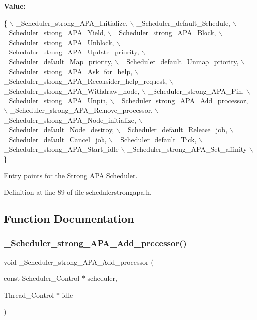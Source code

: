 {\bfseries Value\+:}
\begin{DoxyCode}
\{ \(\backslash\)
    \_Scheduler\_strong\_APA\_Initialize, \(\backslash\)
    \_Scheduler\_default\_Schedule, \(\backslash\)
    \_Scheduler\_strong\_APA\_Yield, \(\backslash\)
    \_Scheduler\_strong\_APA\_Block, \(\backslash\)
    \_Scheduler\_strong\_APA\_Unblock, \(\backslash\)
    \_Scheduler\_strong\_APA\_Update\_priority, \(\backslash\)
    \_Scheduler\_default\_Map\_priority, \(\backslash\)
    \_Scheduler\_default\_Unmap\_priority, \(\backslash\)
    \_Scheduler\_strong\_APA\_Ask\_for\_help, \(\backslash\)
    \_Scheduler\_strong\_APA\_Reconsider\_help\_request, \(\backslash\)
    \_Scheduler\_strong\_APA\_Withdraw\_node, \(\backslash\)
    \_Scheduler\_strong\_APA\_Pin, \(\backslash\)
    \_Scheduler\_strong\_APA\_Unpin, \(\backslash\)
    \_Scheduler\_strong\_APA\_Add\_processor, \(\backslash\)
    \_Scheduler\_strong\_APA\_Remove\_processor, \(\backslash\)
    \_Scheduler\_strong\_APA\_Node\_initialize, \(\backslash\)
    \_Scheduler\_default\_Node\_destroy, \(\backslash\)
    \_Scheduler\_default\_Release\_job, \(\backslash\)
    \_Scheduler\_default\_Cancel\_job, \(\backslash\)
    \_Scheduler\_default\_Tick, \(\backslash\)
    \_Scheduler\_strong\_APA\_Start\_idle \(\backslash\)
    \_Scheduler\_strong\_APA\_Set\_affinity \(\backslash\)
  \}
\end{DoxyCode}


Entry points for the Strong A\+PA Scheduler. 



Definition at line 89 of file schedulerstrongapa.\+h.



\subsection{Function Documentation}
\mbox{\label{group__RTEMSScoreSchedulerStrongAPA_ga6ac09dac24785561fd7c5ee5bbd8f5ca}} 
\subsubsection{\texorpdfstring{\+\_\+\+Scheduler\+\_\+strong\+\_\+\+A\+P\+A\+\_\+\+Add\+\_\+processor()}{\_Scheduler\_strong\_APA\_Add\_processor()}}
{\footnotesize\ttfamily void \+\_\+\+Scheduler\+\_\+strong\+\_\+\+A\+P\+A\+\_\+\+Add\+\_\+processor (\begin{DoxyParamCaption}\item[{const Scheduler\+\_\+\+Control $\ast$}]{scheduler,  }\item[{Thread\+\_\+\+Control $\ast$}]{idle }\end{DoxyParamCaption})}



